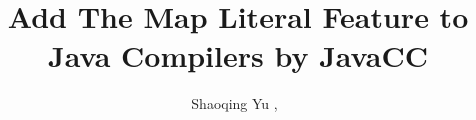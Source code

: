 




	\title{Add The Map Literal Feature to Java Compilers by JavaCC}
	
	\author{Shaoqing Yu ,~}%
	
	
